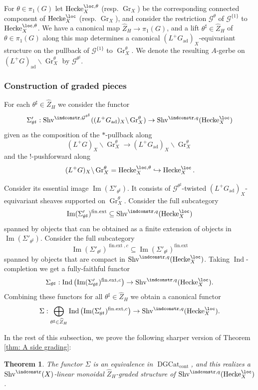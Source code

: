 \documentclass[10pt]{amsart}
\newcommand{\sssec}{\subsubsection}
\newtheorem{thm}[subsubsection]{Theorem}
\theoremstyle{remark}
\newcommand{\wh}{\widehat}
\newcommand{\on}{\operatorname}
\newcommand{\cG}{\mathcal{G}}
\newcommand{\DGcat}{\on{DGCat}_{\on{cont}}}
\newcommand{\Shv}{\on{Shv}}
\DeclareMathOperator{\Ind}{Ind}
\newcommand{\Gr}{\on{Gr}}
\newcommand{\Hecke}{\on{Hecke}}
\begin{document}
For $\theta\in\pi_1(G)$ let $\Hecke^{\loc,\theta}_X$ (resp. $\Gr_{X}$) be the corresponding connected component of $\Hecke^{\loc}_X$ (resp. $\Gr_X$), and consider the restriction $\cG^{\theta}$ of $\cG^{\{1\}}$ to $\Hecke^{\loc,\theta}_X$. We have a canonical map
$\wh{Z}_H\rightarrow \pi_1(G)$, and a lift $\theta^{\sharp}\in \wh{Z}_H$ of $\theta\in\pi_1(G)$ along this map determines a canonical $(L^+G_{\on{ad}})_X$-equivariant structure on the pullback of $\cG^{\{1\}}$ to $\Gr^{\theta}_X$. We denote the resulting $A$-gerbe on $(L^+G)_{\on{ad}}\backslash \Gr^{\theta}_X$ by $\cG^{\theta^{\sharp}}$.

\sssec{Construction of graded pieces}
For each $\theta^{\sharp}\in\wh{Z}_H$ we consider the functor
\[\Sigma'_{\theta^{\sharp}}: \Shv^{\indconstr,\cG^{\theta^{\sharp}}}((L^+G_{\on{ad}})_X\backslash\Gr^{\theta}_X)\rightarrow \Shv^{\indconstr,q}(\Hecke^{\loc}_X)\]
given as the composition of the $*$-pullback along
\[(L^+G)_X\backslash \Gr^{\theta}_X\rightarrow (L^+G_{\on{ad}})_X\backslash \Gr^{\theta}_X\]
and the $!$-pushforward along
\[(L^+G)_X\backslash \Gr^{\theta}_X = \Hecke^{\loc,\theta}_X\hookrightarrow \Hecke^{\loc}_X.\]

Consider its essential image $\on{Im}(\Sigma'_{\theta^{\sharp}})$. It consists of $\cG^{\theta^{\sharp}}$-twisted $(L^+G_{\on{ad}})_X$-equivariant sheaves supported on $\Gr^{\theta}_X$. Consider the full subcategory
\[\on{Im}(\Sigma'_{\theta^{\sharp}})^{\on{fin.ext}}\subseteq \Shv^{\indconstr,q}(\Hecke^{\loc}_X)\]
spanned by objects that can be obtained as a finite extension of objects in $\on{Im}(\Sigma'_{\theta^{\sharp}})$. Consider the full subcategory 
\[\on{Im}(\Sigma'_{\theta^{\sharp}})^{\on{fin.ext},c}\subseteq \on{Im}(\Sigma'_{\theta^{\sharp}})^{\on{fin.ext}}\]
spanned by objects that are compact in $\Shv^{\indconstr,q}(\Hecke^{\loc}_X)$.
Taking $\Ind$-completion we get a fully-faithful functor
\[\Sigma_{\theta^{\sharp}}:\Ind\left(\on{Im}(\Sigma'_{\theta^{\sharp}})^{\on{fin.ext},c}\right) \rightarrow \Shv^{\indconstr,q}(\Hecke^{\loc}_X). \]
Combining these functors for all $\theta^{\sharp}\in\wh{Z}_H$ we obtain a canonical functor
\[\Sigma: \bigoplus_{\theta^{\sharp}\in\wh{Z}_H}\Ind\left(\on{Im}(\Sigma'_{\theta^{\sharp}})^{\on{fin.ext},c}\right)\rightarrow \Shv^{\indconstr,q}(\Hecke^{\loc}_X).\]

In the rest of this subsection, we prove the following sharper version of Theorem \ref{thm: A side grading}:
\begin{thm}\label{thm: A side grading sharper}
    The functor $\Sigma$ is an equivalence in $\DGcat$, and this realizes a $\Shv^{\indconstr}(X)$-linear monoidal $\wh{Z}_H$-graded structure of $\Shv^{\indconstr,q}(\Hecke^{\loc}_X)$.
\end{thm}
\end{document}
